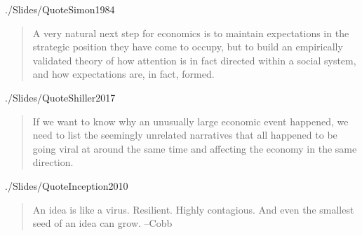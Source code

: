 \begin{frontmatter}
\begin{verbatimwrite}{./Slides/QuoteSimon1984}%
\begin{quote}
	A very natural next step for economics is to maintain expectations in
	the strategic position they have come to occupy, but to build an
	empirically validated theory of how attention is in fact directed within
	a social system, and how expectations are, in fact, formed.
\end{quote}
\end{verbatimwrite} %

\begin{verbatimwrite}{./Slides/QuoteShiller2017}%
  \begin{quote}
    If we want to know why an unusually large economic event happened, we
    need to list the seemingly unrelated narratives that all happened to be
    going viral at around the same time and affecting the economy in the
    same direction.
  \end{quote}
\end{verbatimwrite} %

\begin{verbatimwrite}{./Slides/QuoteInception2010}%
\begin{quote}
An idea is like a virus. Resilient. Highly contagious. And even the smallest seed of an idea can grow.   --Cobb

\end{quote}
\end{verbatimwrite} %


\end{frontmatter}%

